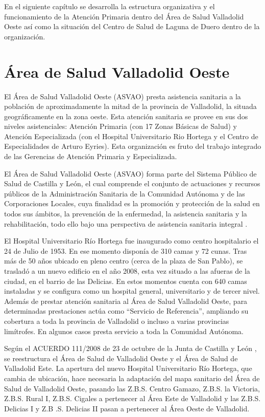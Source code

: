 En el siguiente capítulo se desarrolla la estructura organizativa y el funcionamiento de la Atención Primaria dentro del Área de Salud Valladolid Oeste así como la situación del Centro de Salud de Laguna de Duero dentro de la organización.

\section{Área de Salud Valladolid Oeste}

El Área de Salud Valladolid Oeste (ASVAO) presta asistencia sanitaria a la población de aproximadamente la mitad de la provincia de Valladolid, la situada geográficamente en la zona oeste.
Esta atención sanitaria se provee en sus dos niveles asistenciales: Atención Primaria (con 17 Zonas Básicas de Salud) y Atención Especializada (con el Hospital Universitario Rio Hortega y el Centro de Especialidades de Arturo Eyries).
Esta organización es fruto del trabajo integrado de las Gerencias de Atención Primaria y Especializada.

El Área de Salud Valladolid Oeste (ASVAO) forma parte del Sistema Público de Salud de Castilla y León, el cual comprende el conjunto de actuaciones y recursos públicos de la Administración Sanitaria de la Comunidad Autónoma y de las Corporaciones Locales, cuya finalidad es la promoción y protección de la salud en todos sus ámbitos, la prevención de la enfermedad, la asistencia sanitaria y la rehabilitación, todo ello bajo una perspectiva de asistencia sanitaria integral \cite{noauthor_ley_2010}.

El Hospital Universitario Río Hortega fue inaugurado como centro hospitalario el 24 de Julio de 1953.
En ese momento disponía de 310 camas y 72 cunas.
Tras más de 50 años ubicado en pleno centro (cerca de la plaza de San Pablo), se trasladó a un nuevo edificio en el año 2008, esta vez situado a las afueras de la ciudad, en el barrio de las Delicias.
En estos momentos cuenta con 640 camas instaladas y se configura como un hospital general, universitario y de tercer nivel.
Además de prestar atención sanitaria al Área de Salud Valladolid Oeste, para determinadas prestaciones actúa como “Servicio de Referencia”, ampliando su cobertura a toda la provincia de Valladolid o incluso a varias provincias limítrofes.
En algunos casos presta servicio a toda la Comunidad Autónoma.

Según el ACUERDO 111/2008 de 23 de octubre de la Junta de Castilla y León \cite{noauthor_bocyl_2008}, se reestructura el Área de Salud de Valladolid Oeste y el Área de Salud de Valladolid Este. La apertura del nuevo Hospital Universitario Río Hortega, que cambia de ubicación, hace necesaria la adaptación del mapa sanitario del Área de Salud de Valladolid Oeste, pasando las Z.B.S. Centro Gamazo, Z.B.S. la Victoria, Z.B.S. Rural I, Z.B.S. Cigales a pertenecer al Área Este de Valladolid y las Z.B.S. Delicias I y Z.B .S. Delicias II pasan a pertenecer al Área Oeste de Valladolid.


